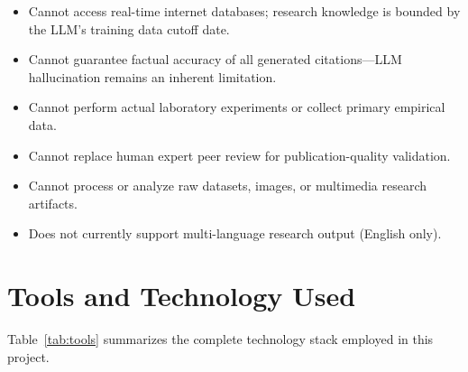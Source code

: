 \begin{itemize}[leftmargin=2cm]
\item Cannot access real-time internet databases; research knowledge is bounded by the LLM's training data cutoff date.
\item Cannot guarantee factual accuracy of all generated citations---LLM hallucination remains an inherent limitation.
\item Cannot perform actual laboratory experiments or collect primary empirical data.
\item Cannot replace human expert peer review for publication-quality validation.
\item Cannot process or analyze raw datasets, images, or multimedia research artifacts.
\item Does not currently support multi-language research output (English only).
\end{itemize}

\section{Tools and Technology Used}

Table~\ref{tab:tools} summarizes the complete technology stack employed in this project.

